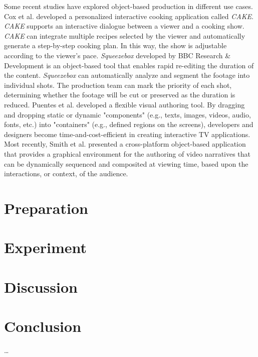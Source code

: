 \documentclass[sigchi-a, authorversion]{acmart}
\begin{document}
Some recent studies have explored object-based production in different use cases. Cox et al. \cite{cox2017} developed a personalized interactive cooking application called \textit{CAKE}. \textit{CAKE} supports an interactive dialogue between a viewer and a cooking show. \textit{CAKE} can integrate multiple recipes selected by the viewer and automatically generate a step-by-step cooking plan. In this way, the show is adjustable according to the viewer's pace. \textit{Squeezebox} developed by BBC Research \& Development \cite{BBC2015} is an object-based tool that enables rapid re-editing the duration of the content. \textit{Squeezebox} can automatically analyze and segment the footage into individual shots. The production team can mark the priority of each shot, determining whether the footage will be cut or preserved as the duration is reduced. Puentes et al. \cite{puentes2017} developed a flexible visual authoring tool. By dragging and dropping static or dynamic "components" (e.g., texts, images, videos, audio, fonts, etc.) into "containers" (e.g., defined regions on the screens), developers and designers become time-and-cost-efficient in creating interactive TV applications. Most recently, Smith et al. \cite{smith2018} presented a cross-platform object-based application that provides a graphical environment for the authoring of video narratives that can be dynamically sequenced and composited at viewing time, based upon the interactions, or context, of the audience.

\section{Preparation}

\section{Experiment}


\section{Discussion}

\section{Conclusion}

\ldots



\end{document}
